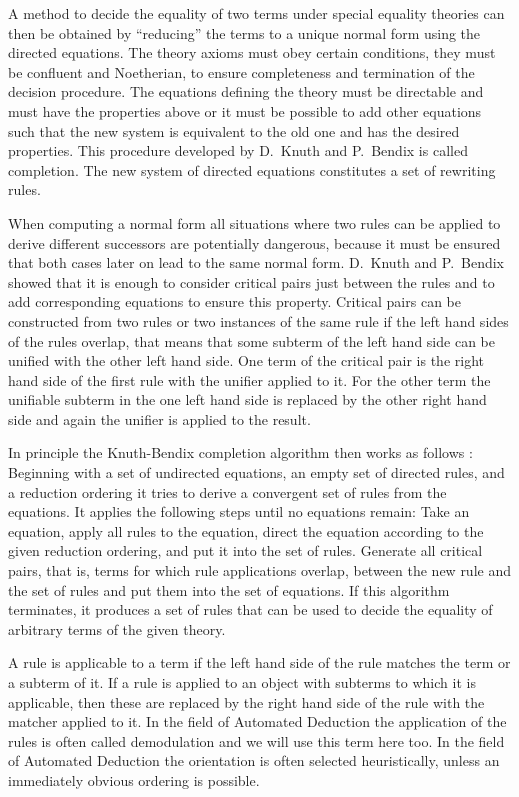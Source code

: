 A method to decide the equality of two terms under
special equality theories can then be obtained by ``reducing'' the
terms to
a unique normal form using the directed equations. The theory axioms
must obey certain conditions, they must be 
confluent and Noetherian,
to ensure completeness
and termination of the decision procedure.
The equations defining the theory must be
directable and must have the properties above or it must be
possible to add other equations such that the new system
is equivalent to the old one and has the desired properties.
 This 
procedure developed by D.\ Knuth and P.\ Bendix \cite{KnBe70}
is called completion. 
The new system of directed equations
constitutes a set of rewriting rules. 

When computing a normal form all situations where two rules can be 
applied to derive different successors are potentially 
dangerous, because it must be 
ensured that both cases later 
on lead to the same normal form. D.\ Knuth 
and P.\ Bendix showed that it is enough to consider critical pairs just
between the
rules and to add corresponding equations to ensure this property.
Critical pairs can be constructed from two rules or two instances of the
same rule if the left hand sides of the rules overlap, that means that some
subterm of the left hand side can be unified with the other left hand
side. One term of the critical pair is the right hand side of the first
rule with the unifier applied to it. For the other term the unifiable subterm
in the one left hand side is replaced by the other right hand side and 
again the unifier is applied to the result.

In principle the Knuth-Bendix completion algorithm then works as follows
\cite{KnBe70,HuOp80,Buchberger85,Dershowitz87,JoLe87}:
Beginning with a set of undirected equations, an empty set of directed
rules, and a reduction ordering it tries to derive a convergent set of rules
from the equations. It applies the following steps
until no equations remain: Take an
equation, apply all rules to the equation, direct the equation according to
the given reduction ordering, and put it
into the set of rules. Generate all critical pairs, that is, terms for which
rule applications overlap, between the new rule and
the set of rules and put them into the set of equations. If this
algorithm terminates, it produces a set of rules that can be used to decide
the equality of arbitrary terms of the given theory.

A rule is applicable to a term if the left hand side of the rule matches
the term or a subterm of it. If a rule is applied to an object with subterms to which it
is applicable, then these are replaced by the right hand side of the rule
with the matcher applied to it. In the field of Automated Deduction the
application of the rules is often called demodulation \cite{WoRoCaSh67,WoOvLuBo84} and we
will use this term here too. In the field of
Automated Deduction the orientation is often
selected heuristically, unless an immediately obvious ordering is possible.


